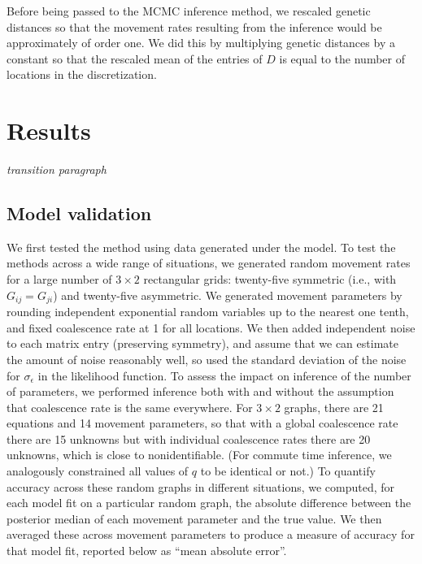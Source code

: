 \documentclass{article}
\newcommand{\plr}[1]{{\em \color{blue} #1}}
\begin{document}
Before being passed to the MCMC inference method,
we rescaled genetic distances so that the movement rates resulting from the inference
would be approximately of order one.
We did this by multiplying genetic distances by a constant
so that the rescaled mean of the entries of $D$
is equal to the number of locations in the discretization. 



\section*{Results}

\plr{transition paragraph}


\subsection*{Model validation}

We first tested the method using data generated under the model.
To test the methods across a wide range of situations,
we generated random movement rates for 
a large number of $3 \times 2$ rectangular grids:
twenty-five symmetric (i.e., with $G_{ij} = G_{ji}$) and twenty-five asymmetric.
We generated movement parameters
by rounding independent exponential random variables up to the nearest one tenth,
and fixed coalescence rate at 1 for all locations.
We then added independent noise to each matrix entry (preserving symmetry),
and assume that we can estimate the amount of noise reasonably well, 
so used the standard deviation of the noise for $\sigma_\epsilon$ in the likelihood function.
To assess the impact on inference of the number of parameters,
we performed inference both with and without the assumption 
that coalescence rate is the same everywhere.
For $3 \times 2$ graphs, there are 21 equations
and 14 movement parameters,
so that with a global coalescence rate there are 15 unknowns
but with individual coalescence rates there are 20 unknowns,
which is close to nonidentifiable.
(For commute time inference, we analogously constrained all values of $q$ to be identical or not.)
To quantify accuracy across these random graphs in different situations,
we computed, for each model fit on a particular random graph,
the absolute difference between the posterior median of each movement parameter
and the true value.
We then averaged these across movement parameters to produce a measure of accuracy for that model fit,
reported below as ``mean absolute error''.
\end{document}

